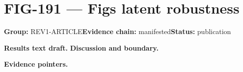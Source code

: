 \clearpage
\section{FIG-191 --- Figs latent robustness}
\label{figpage:fig-191}
\textbf{Group:} REV1-ARTICLE\quad \textbf{Evidence chain:} manifested\quad \textbf{Status:} publication

\textbf{Results text draft.} 
\textbf{Discussion and boundary.} 


\textbf{Evidence pointers.}



\vfill
